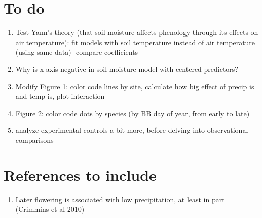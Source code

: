 \documentclass{article}
\begin{document}
\section* {To do}
\begin{enumerate}
\item Test Yann's theory (that soil moisture affects phenology through its effects on air temperature): fit models with soil temperature instead of air temperature (using same data)- compare coefficients
\item Why is x-axis negative in soil moisture model with centered predictors?
\item Modify Figure 1: color code lines by site, calculate how big effect of precip is and temp is, plot interaction
\item Figure 2: color code dots by species (by BB day of year, from early to late)
\item analyze experimental controls a bit more, before delving into observational comparisons
\end{enumerate}
\section*{References to include}
\begin{enumerate}
\item Later flowering is  associated with low precipitation, at least in part (Crimmins et al 2010)
\end{enumerate}
\end{document}
